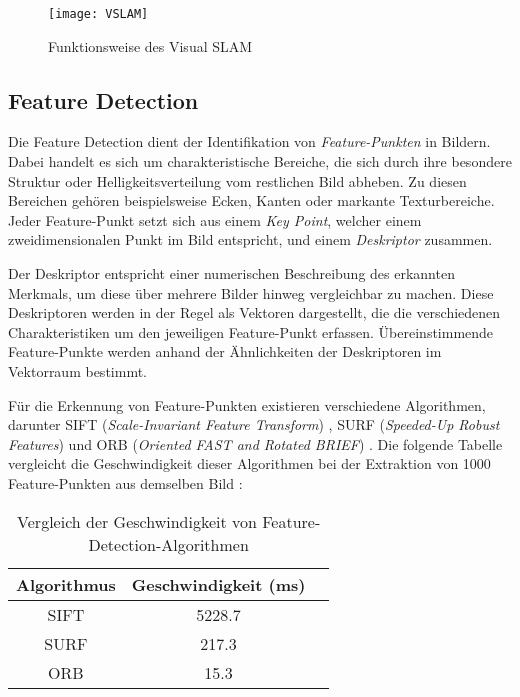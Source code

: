 \begin{figure}
    \centering
    \texttt{[image: VSLAM]}
    \caption{Funktionsweise des Visual SLAM \cite{tourani2022vSLAMTrends}\label{fig:VSLAM}}\par
\end{figure}

\subsection{Feature Detection}

Die Feature Detection dient der Identifikation von \emph{Feature-Punkten} in Bildern. Dabei handelt es sich um charakteristische Bereiche, die sich durch ihre besondere Struktur oder Helligkeitsverteilung vom restlichen Bild abheben. Zu diesen Bereichen gehören beispielsweise Ecken, Kanten oder markante Texturbereiche. Jeder Feature-Punkt setzt sich aus einem \emph{Key Point}, welcher einem zweidimensionalen Punkt im Bild entspricht, und einem \emph{Deskriptor} zusammen. \cite{gao2021vSLAM, szeliski2022computerVision}

Der Deskriptor entspricht einer numerischen Beschreibung des erkannten Merkmals, um diese über mehrere Bilder hinweg vergleichbar zu machen. Diese Deskriptoren werden in der Regel als Vektoren dargestellt, die die verschiedenen Charakteristiken um den jeweiligen Feature-Punkt erfassen. Übereinstimmende Feature-Punkte werden anhand der Ähnlichkeiten der Deskriptoren im Vektorraum bestimmt. \cite{gao2021vSLAM, szeliski2022computerVision}

Für die Erkennung von Feature-Punkten existieren verschiedene Algorithmen, darunter SIFT (\emph{Scale-Invariant Feature Transform}) \cite{lowe1999sift}, SURF (\emph{Speeded-Up Robust Features}) \cite{bay2006surf} und ORB (\emph{Oriented FAST and Rotated BRIEF}) \cite{rublee2011orb}. Die folgende Tabelle vergleicht die Geschwindigkeit dieser Algorithmen bei der Extraktion von 1000 Feature-Punkten aus demselben Bild \cite{gao2021vSLAM}:

\begin{table}
    \centering
    \begin{tabular}{ccl} 
        \hline
        Algorithmus & Geschwindigkeit (ms) \\ 
        \hline
        SIFT & 5228.7 \\ 
        SURF & 217.3 \\ 
        ORB & 15.3 \\ 
        \hline
    \end{tabular}
    \caption{Vergleich der Geschwindigkeit von Feature-Detection-Algorithmen \cite{gao2021vSLAM}}
    \label{tab:AlgorithmComparison}
\end{table}

